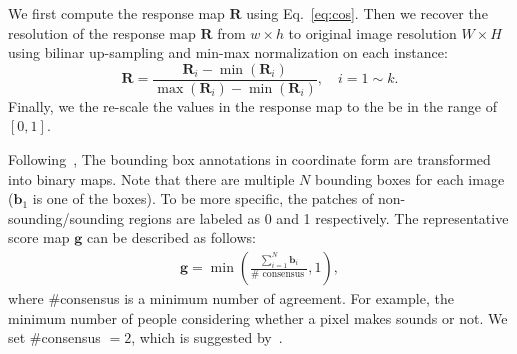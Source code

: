 We first compute the response map $\mathbf{R}$ using Eq.~\eqref{eq:cos}.
%
Then we recover the resolution of the response map $\mathbf{R}$ from $w\times h$ to original image resolution $W \times H$ using bilinar up-sampling and min-max normalization on each instance:
\begin{equation}
\label{eq:normalization}
\mathbf{R} = \frac{\mathbf{R}_i -\min(\mathbf{R}_i)}{\max(\mathbf{R}_i) - \min(\mathbf{R}_i)},
\quad i=1\sim k.
\end{equation}
%
Finally, we the re-scale the values in the response map to the be in the range of $[0, 1]$.


% 

Following~\cite{av_cvpr18_lls,av_tpami20_lls,av_eccv20_mms_loc,av_cvpr19_deep_cluster,av_arxiv_curricumlum_av_clutser}, 
The bounding box annotations in coordinate form are transformed into binary maps.
% 
Note that there are multiple $N$ bounding boxes for each image (\eg $\mathbf{b}_1$ is one of the boxes).
% 
To be more specific, the patches of non-sounding/sounding regions are labeled as 0 and 1 respectively. 
% 
The representative score map $\mathbf{g}$ can be described as follows:
\begin{equation}
\label{eq:loc_gt}
\begin{aligned}
\mathbf{g}=\min \left(\frac{\sum_{i=1}^{N} \mathbf{b}_{i}}{\# \text { consensus }}, 1\right),
\end{aligned}
\end{equation}
where \#consensus is a minimum number of agreement. For example, the minimum number of people considering whether a pixel makes sounds or not. 
% 
We set \#consensus $=2$, which is suggested by~\cite{av_cvpr18_lls,av_tpami20_lls}.
% 

